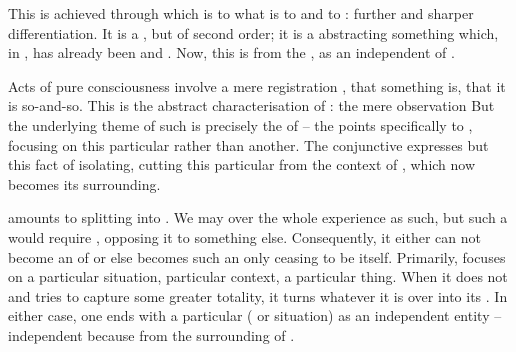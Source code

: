 This is achieved through  which is to  what
 is to  and  to :
further and sharper differentiation.  It
is a , but of second order; it is a 
abstracting something which, in , has already been
 and . Now, this is  from the
,  as an independent  of
.

Acts of pure  consciousness involve a mere registration , that something is, that it is so-and-so.  This is the abstract
characterisation of : the mere observation  But the
underlying theme of such  is precisely the  of
 -- the   points specifically to , focusing on
this particular   rather than another.  The conjunctive 
expresses but this fact of isolating, {cutting} this particular 
from the context of , which now becomes its surrounding.


\pa\label{pa:attentive}  amounts to splitting 
into . We may  over the whole experience as such,
but such a  would require  ,
opposing it to something else. Consequently, it either can not become an
 of  or else becomes such an  only ceasing
to be itself.  Primarily,  focuses on a particular situation,
particular context, a particular thing. When it does not and tries to capture
some greater totality, it turns whatever it is  over into its
. In either case, one ends with a particular ( or 
situation)  as an independent entity -- independent because
 from the surrounding of .

